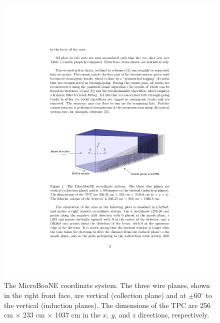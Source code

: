 \documentclass[a4paper,11pt]{article}
\begin{document}
\begin{figure}[htbp]
  \begin{center}
    \includegraphics[width=0.8\linewidth]{figures/coord.pdf}

    \caption{The MicroBooNE coordinate system. The three wire planes, shown in the right front face, are vertical (collection plane) and at  $\pm60^{\circ}$ to the vertical (induction planes). The dimensions of the TPC are 256 cm $\times$ 233 cm $\times$ 1037 cm in the $x$, $y$, and $z$ directions, respectively.} \label{fig:coord}
  \end{center}
\end{figure}
\end{document}
